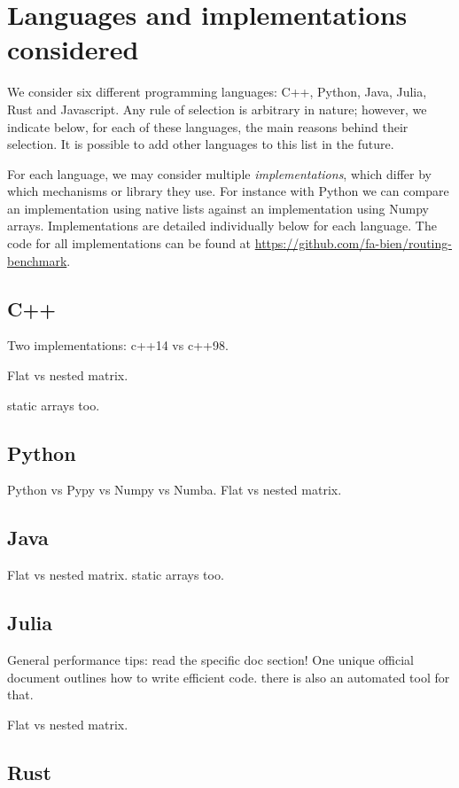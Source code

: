 \documentclass[11pt,a4paper,notitlepage]{article}
\begin{document}
\section{Languages and implementations considered}
We consider six different programming languages: C++, Python, Java,
Julia, Rust and Javascript. Any rule of selection
is arbitrary in nature; however, we indicate below, for each of these
languages, the main reasons behind their selection. It is possible to
add other languages to this list in the future.

For each language, we may consider multiple \emph{implementations},
which differ by which mechanisms or library they use. For
instance with Python we can compare an implementation using native
lists against an implementation using Numpy arrays. Implementations are
detailed individually below for each language. The code for all
implementations can be found at
\url{https://github.com/fa-bien/routing-benchmark}.

\subsection{C++}
Two implementations: c++14 vs c++98.

Flat vs nested matrix.

static arrays too.

\subsection{Python}
Python vs Pypy vs Numpy vs Numba.
Flat vs nested matrix.

\subsection{Java}
Flat vs nested matrix.
static arrays too.

\subsection{Julia}
General performance tips: read the specific doc section! One unique
official document outlines how to write efficient code. there is also
an automated tool for that.

Flat vs nested matrix.

\subsection{Rust}
\end{document}
